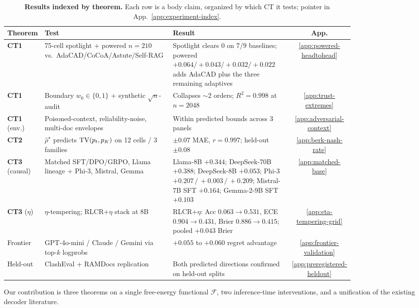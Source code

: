 \begin{table}[h]
\centering\scriptsize
\setlength{\tabcolsep}{3pt}
\renewcommand{\arraystretch}{0.95}
\caption{\textbf{Results indexed by theorem.}  Each row is a body
claim, organized by which CT it tests; pointer in
App.~\ref{app:experiment-index}.}
\label{tab:experiment-overview}
\begin{tabular}{p{0.07\linewidth}p{0.40\linewidth}p{0.36\linewidth}c}
\toprule
\textbf{Theorem} & \textbf{Test} & \textbf{Result}  & \textbf{App.}\\
\midrule
\textbf{CT1} & 75-cell spotlight + powered $n{=}210$ vs.\ AdaCAD/CoCoA/Astute/Self-RAG & Spotlight clears $0$ on $7/9$ baselines; powered $+0.064/+0.043/+0.032/+0.022$ adds AdaCAD plus the three remaining adaptives & \ref{app:powered-headtohead} \\
\textbf{CT1} & Boundary $w_0{\in}\{0,1\}$ + synthetic $\sqrt n$-audit & Collapses $\sim\!2$ orders; $R^2{=}0.998$ at $n{=}2048$ & \ref{app:trust-extremes} \\
\textbf{CT1} (env.) & Poisoned-context, reliability-noise, multi-doc envelopes & Within predicted bounds across 3 panels & \ref{app:adversarial-context} \\
\textbf{CT2} & $\widehat\rho^\star$ predicts $\operatorname{TV}(p_t,p_K)$ on 12 cells / 3 families & $\pm 0.07$ MAE, $r{=}0.997$; held-out $\pm 0.08$ & \ref{app:berk-nash-rate} \\
\textbf{CT3} (causal) & Matched SFT/DPO/GRPO, Llama lineage + Phi-3, Mistral, Gemma & Llama-8B $+0.344$; DeepSeek-70B $+0.388$; DeepSeek-8B $+0.053$; Phi-3 $+0.207\,/\,+0.003\,/\,+0.209$; Mistral-7B SFT $+0.164$; Gemma-2-9B SFT $+0.103$ & \ref{app:matched-base} \\
\textbf{CT3} ($\eta$) & $\eta$-tempering; RLCR$+\eta$ stack at 8B & RLCR$+\eta$: Acc $0.063{\to}0.531$, ECE $0.904{\to}0.431$, Brier $0.886{\to}0.415$; pooled $+0.043$ Brier & \ref{app:eta-tempering-grid} \\
\midrule
Frontier & GPT-4o-mini / Claude / Gemini via top-$k$ logprobs & $+0.055$ to $+0.060$ regret advantage & \ref{app:frontier-validation} \\
Held-out & ClashEval + RAMDocs replication & Both predicted directions confirmed on held-out splits & \ref{app:preregistered-heldout} \\
\bottomrule
\end{tabular}
\end{table}

Our contribution is three theorems on a single free-energy functional $\mathcal{F}$, two inference-time interventions, and a unification of the existing decoder literature.

